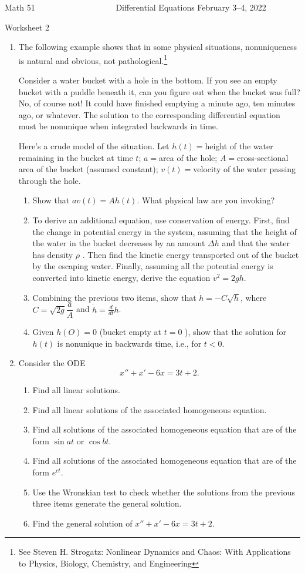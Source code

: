 \documentclass[12pt]{article}
\begin{document}

\noindent
Math 51~~~~~~~~~~~~~~~~~~~ \hfill Differential Equations \hfill February 3--4, 2022 
 \centerline{Worksheet 2}

\begin{enumerate}
\item[1.] The following example shows that in some physical situations,
  nonuniqueness is natural and obvious, not pathological.\footnote{See
  Steven H. Strogatz: Nonlinear Dynamics and Chaos: With Applications to Physics, Biology, Chemistry, and Engineering}

  Consider a water bucket with a hole in the bottom. If you see an empty bucket with a puddle beneath it, can you figure out when the bucket was full? No, of course not! It could have finished emptying a minute ago, ten minutes ago, or whatever. The solution to the corresponding differential equation must be nonunique when integrated backwards in time.

Here's a crude model of the situation. Let \(h(t)=\)height of the water
remaining in the bucket at time \(t\); \(a =\)area of the hole; \(A
=\)cross-sectional area of the bucket (assumed constant); \(v(t)
=\)velocity of the water passing through the hole.
\begin{enumerate}
\item Show that \(av(t) = Ah(t)\). What physical law are you invoking?
\item To derive an additional equation, use conservation of energy. First, find the
change in potential energy in the system, assuming that the height of the
water in the bucket decreases by an amount \(\Delta h\) and that the water has density \(\rho\) . Then find the kinetic energy transported out of the bucket by the escaping water. Finally, assuming all the potential energy is converted into kinetic energy, derive the equation \(v^2 = 2gh\).
\item Combining the previous two items, show that \(\dot h=-C\sqrt h\),  where \(C=\sqrt{2g}\dfrac aA\) and \(\dot h=\frac{d}{dt}h\).
\item Given \(h(O) =0\) (bucket empty at \(t =0\) ), show that the solution for \(h(t)\) is nonunique in backwards time, i.e., for \(t < 0\).
\end{enumerate}
\newpage
\item[2.] 
Consider the ODE   
\[
x''+x'-6x=3t+2.
\]
\begin{enumerate}
\item Find all linear solutions.
\item Find all linear solutions of the associated homogeneous equation.
\item Find all solutions of the associated homogeneous equation that are of
  the form \(\sin at\) or \(\cos bt\).
\item Find all solutions of the associated homogeneous equation that are of
  the form \(e^{ct}\).
\item Use the Wronskian test to check whether the solutions from the
  previous three items generate the general solution.
\item Find the general solution of  \(x''+x'-6x=3t+2\).
\end{enumerate}
\end{enumerate}
\end{document}
